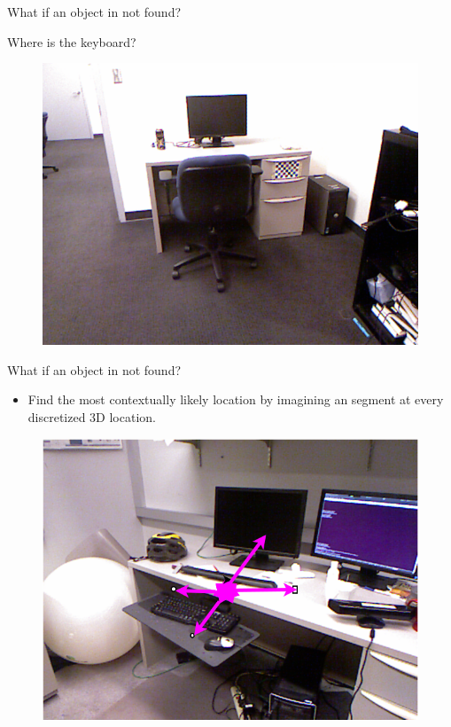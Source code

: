 \documentclass{beamer}
\begin{document}
\begin{frame}{What if an object in not found?}
\begin{center}
Where is the keyboard?
 \begin{figure}   
\includegraphics[width=0.9\linewidth]{contextorig.png}
 \end{figure}
 \end{center}
\end{frame}

\begin{frame}{What if an object in not found?}
\begin{itemize}
\item Find the most contextually likely location by imagining an segment at every discretized 3D location.
\end{itemize}
 \begin{figure}   
 \includegraphics[scale=0.3]{heatImage.png} 
 \end{figure}
\end{frame}
\end{document}
